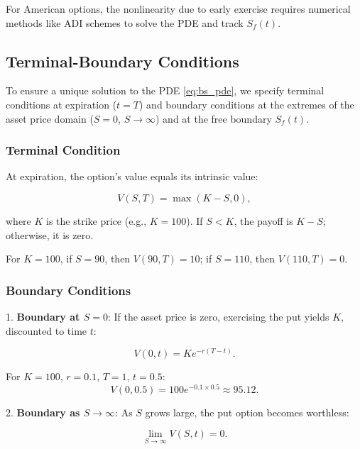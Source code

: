 \documentclass{article}
\begin{document}
For American options, the nonlinearity due to early exercise requires numerical methods like ADI schemes to solve the PDE and track \( S_f(t) \).

\subsection{Terminal-Boundary Conditions}
To ensure a unique solution to the PDE \eqref{eq:bs_pde}, we specify terminal conditions at expiration (\( t = T \)) and boundary conditions at the extremes of the asset price domain (\( S = 0 \), \( S \to \infty \)) and at the free boundary \( S_f(t) \).

\subsubsection{Terminal Condition}
At expiration, the option's value equals its intrinsic value:

\begin{equation}
V(S, T) = \max(K - S, 0),
\label{eq:terminal_condition}
\end{equation}

where \( K \) is the strike price (e.g., \( K = 100 \)). If \( S < K \), the payoff is \( K - S \); otherwise, it is zero.

For \( K = 100 \), if \( S = 90 \), then \( V(90, T) = 10 \); if \( S = 110 \), then \( V(110, T) = 0 \).

\subsubsection{Boundary Conditions}
1. \textbf{Boundary at \( S = 0 \)}:
   If the asset price is zero, exercising the put yields \( K \), discounted to time \( t \):

   \begin{equation}
   V(0, t) = K e^{-r(T - t)}.
   \label{eq:boundary_s0}
   \end{equation}

   For \( K = 100 \), \( r = 0.1 \), \( T = 1 \), \( t = 0.5 \):
   \[
   V(0, 0.5) = 100 e^{-0.1 \times 0.5} \approx 95.12.
   \]

2. \textbf{Boundary as \( S \to \infty \)}:
   As \( S \) grows large, the put option becomes worthless:

   \begin{equation}
   \lim_{S \to \infty} V(S, t) = 0.
   \label{eq:boundary_sinf}
   \end{equation}
\end{document}
